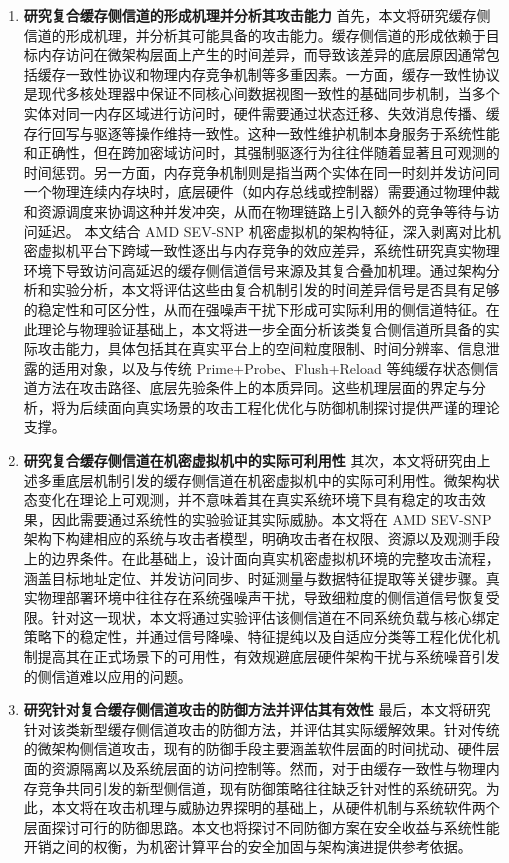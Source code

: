 \begin{enumerate}
  \item \textbf{研究复合缓存侧信道的形成机理并分析其攻击能力} \newline
    首先，本文将研究缓存侧信道的形成机理，并分析其可能具备的攻击能力。缓存侧信道的形成依赖于目标内存访问在微架构层面上产生的时间差异，而导致该差异的底层原因通常包括缓存一致性协议和物理内存竞争机制等多重因素。一方面，缓存一致性协议是现代多核处理器中保证不同核心间数据视图一致性的基础同步机制，当多个实体对同一内存区域进行访问时，硬件需要通过状态迁移、失效消息传播、缓存行回写与驱逐等操作维持一致性\cite{amd64manual}。这种一致性维护机制本身服务于系统性能和正确性，但在跨加密域访问时，其强制驱逐行为往往伴随着显著且可观测的时间惩罚。另一方面，内存竞争机制则是指当两个实体在同一时刻并发访问同一个物理连续内存块时，底层硬件（如内存总线或控制器）需要通过物理仲裁和资源调度来协调这种并发冲突，从而在物理链路上引入额外的竞争等待与访问延迟\cite{ge2018survey}。
    本文结合 AMD SEV-SNP 机密虚拟机的架构特征，深入剥离对比机密虚拟机平台下跨域一致性逐出与内存竞争的效应差异，系统性研究真实物理环境下导致访问高延迟的缓存侧信道信号来源及其复合叠加机理。通过架构分析和实验分析，本文将评估这些由复合机制引发的时间差异信号是否具有足够的稳定性和可区分性，从而在强噪声干扰下形成可实际利用的侧信道特征。在此理论与物理验证基础上，本文将进一步全面分析该类复合侧信道所具备的实际攻击能力，具体包括其在真实平台上的空间粒度限制、时间分辨率、信息泄露的适用对象，以及与传统 Prime+Probe、Flush+Reload 等纯缓存状态侧信道方法在攻击路径、底层先验条件上的本质异同。这些机理层面的界定与分析，将为后续面向真实场景的攻击工程化优化与防御机制探讨提供严谨的理论支撑。

  \item \textbf{研究复合缓存侧信道在机密虚拟机中的实际可利用性}\newline
    其次，本文将研究由上述多重底层机制引发的缓存侧信道在机密虚拟机中的实际可利用性。微架构状态变化在理论上可观测，并不意味着其在真实系统环境下具有稳定的攻击效果，因此需要通过系统性的实验验证其实际威胁。本文将在 AMD SEV-SNP 架构下构建相应的系统与攻击者模型，明确攻击者在权限、资源以及观测手段上的边界条件。在此基础上，设计面向真实机密虚拟机环境的完整攻击流程，涵盖目标地址定位、并发访问同步、时延测量与数据特征提取等关键步骤。真实物理部署环境中往往存在系统强噪声干扰，导致细粒度的侧信道信号恢复受限。针对这一现状，本文将通过实验评估该侧信道在不同系统负载与核心绑定策略下的稳定性，并通过信号降噪、特征提纯以及自适应分类等工程化优化机制提高其在正式场景下的可用性，有效规避底层硬件架构干扰与系统噪音引发的侧信道难以应用的问题。

  \item \textbf{研究针对复合缓存侧信道攻击的防御方法并评估其有效性}\newline
    最后，本文将研究针对该类新型缓存侧信道攻击的防御方法，并评估其实际缓解效果。针对传统的微架构侧信道攻击，现有的防御手段主要涵盖软件层面的时间扰动、硬件层面的资源隔离以及系统层面的访问控制等\cite{ge2018survey}。然而，对于由缓存一致性与物理内存竞争共同引发的新型侧信道，现有防御策略往往缺乏针对性的系统研究。为此，本文将在攻击机理与威胁边界探明的基础上，从硬件机制与系统软件两个层面探讨可行的防御思路。本文也将探讨不同防御方案在安全收益与系统性能开销之间的权衡，为机密计算平台的安全加固与架构演进提供参考依据。
\end{enumerate}

